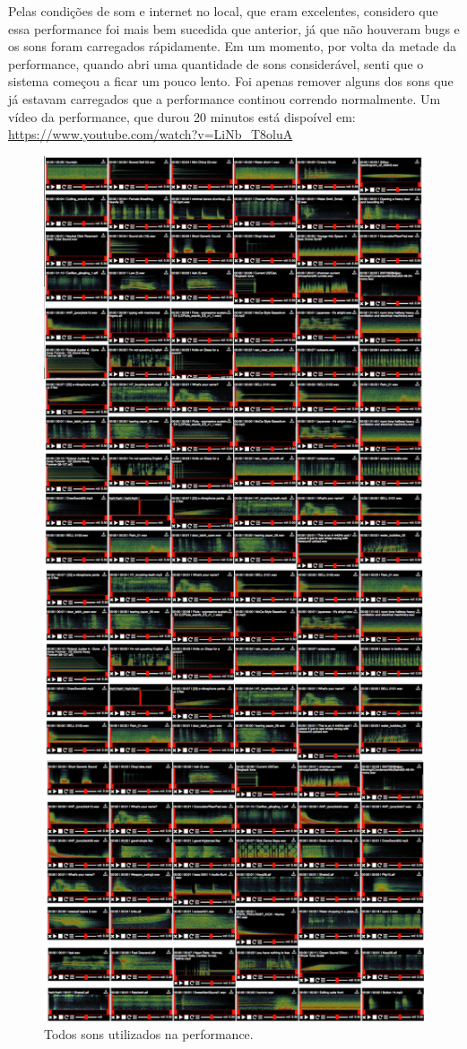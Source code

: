 Pelas condições de som e internet no local, que eram excelentes, considero que essa performance foi mais bem sucedida que anterior, já que não houveram bugs e os sons foram carregados rápidamente. Em um momento, por volta da metade da performance, quando abri uma quantidade de sons considerável, senti que o sistema começou a ficar um pouco lento. Foi apenas remover alguns dos sons que já estavam carregados que a performance continou correndo normalmente. Um vídeo da performance, que durou 20 minutos está dispoível em: \url{https://www.youtube.com/watch?v=LiNb_T8oluA}

\begin{figure}

\includegraphics[width=0.8\linewidth]{pictures/cap4/tenderbuttonssounds}
\caption{Todos sons utilizados na performance.}
\label{diagram}
\end{figure}




